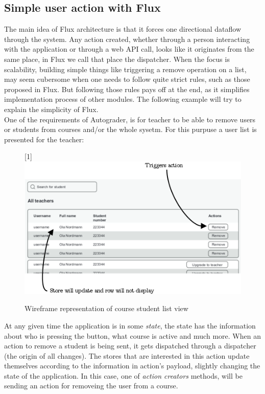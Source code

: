 \subsection{Simple user action with Flux}\label{sec:simplefluxexample}
The main idea of Flux architecture is that it forces one directional dataflow through the system. Any action created, whether through a person interacting with the application or through a web API call, looks like it originates from the same place, in Flux we call that place the dispatcher. When the focus is scalability, building simple things like triggering a remove operation on a list, may seem cubersome when one needs to follow quite strict rules, such as those proposed in Flux. But following those rules pays off at the end, as it simplifies implementation process of other modules. The following example will try to explain the simplicity of Flux.
\\One of the requirements of Autograder, is for teacher to be able to remove users or students from courses and/or the whole sysetm. For this purpuse a user list is presented for the teacher:
\begin{figure}[h]
  \scalebox{1}[1]{{\includegraphics[width=1\linewidth]{graphics/simpleremoveuser.png}}}
  \caption{Wireframe representation of course student list view}
  \label{fig:simpleremoveuser}
\end{figure}

At any given time the application is in some \emph{state}, the state has the information about who is pressing the button, what course is active and much more. When an action to remove a student is being sent, it gets dispatched through a dispatcher (the origin of all changes). The stores that are interested in this action update themselves according to the information in action's payload, slightly changing the state of the application. In this case, one of \emph{action creators} methods, will be sending an action for removeing the user from a course.

